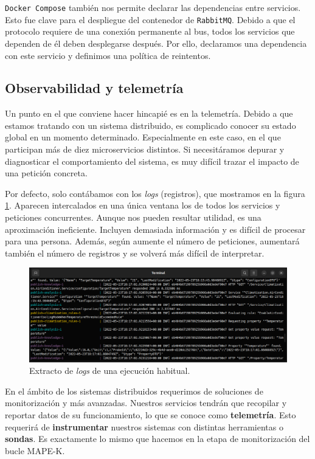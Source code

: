 \texttt{Docker Compose} también nos permite declarar las dependencias entre servicios. Esto fue clave para el despliegue del contenedor de \texttt{RabbitMQ}. Debido a que el protocolo requiere de una conexión permanente al bus\cite{johanssonPartRabbitMQBest2019}, todos los servicios que dependen de él deben desplegarse después. Por ello, declaramos una dependencia con este servicio y definimos una política de reintentos.

\subsection{Observabilidad y telemetría}

Un punto en el que conviene hacer hincapié es en la telemetría. Debido a que estamos tratando con un sistema distribuido, es complicado conocer su estado global en un momento determinado. Especialmente en este caso, en el que participan más de diez microservicios distintos. Si necesitáramos depurar y diagnosticar el comportamiento del sistema, es muy difícil trazar el impacto de una petición concreta.

Por defecto, solo contábamos con los \emph{logs} (registros), que mostramos en la figura \ref{fig:console-logs}. Aparecen intercalados en una única ventana los de todos los servicios y peticiones concurrentes. Aunque nos pueden resultar utilidad, es una aproximación ineficiente. Incluyen demasiada información y es difícil de procesar para una persona. Además, según aumente el número de peticiones, aumentará también el número de registros y se volverá más difícil de interpretar.

\begin{figure}[h]
  \centering
  \includegraphics[scale=1.35]{cap_despliegue/images/console-logs}
  \caption{Extracto de \emph{logs} de una ejecución habitual.}
  \label{fig:console-logs}
\end{figure}

En el ámbito de los sistemas distribuidos requerimos de soluciones de monitorización y  más avanzadas. \cite{newmanBuildingMicroservicesDesigning2021} Nuestros servicios tendrán que recopilar y reportar datos de su funcionamiento, lo que se conoce como \textbf{telemetría}. Esto requerirá de \textbf{instrumentar} nuestros sistemas con distintas herramientas o \textbf{sondas}. Es exactamente lo mismo que hacemos en la etapa de monitorización del bucle MAPE-K.

